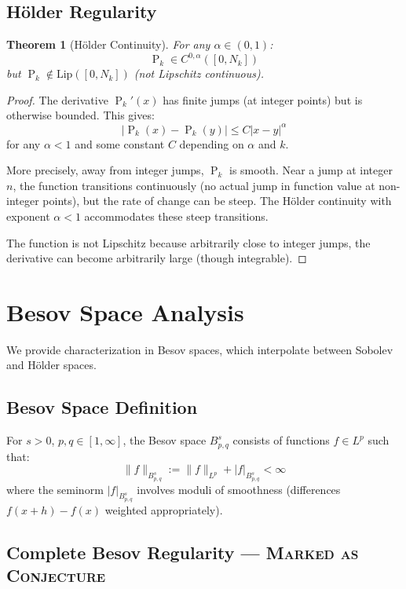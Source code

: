 ﻿\documentclass[12pt,a4paper]{report}
\theoremstyle{plain}
\newtheorem{theorem}{Theorem}[section]
\theoremstyle{definition}
\DeclareMathOperator{\Pk}{P}
\begin{document}
\section{H\"older Regularity}

\begin{theorem}[H\"older Continuity]
\label{thm:holder}
For any $\alpha \in (0,1)$:
\[
\Pk_k \in C^{0,\alpha}([0,N_k])
\]
but $\Pk_k \notin \text{Lip}([0,N_k])$ (not Lipschitz continuous).
\end{theorem}

\begin{proof}
The derivative $\Pk_k'(x)$ has finite jumps (at integer points) but is otherwise bounded. This gives:
\[
|\Pk_k(x) - \Pk_k(y)| \leq C|x-y|^{\alpha}
\]
for any $\alpha < 1$ and some constant $C$ depending on $\alpha$ and $k$.

More precisely, away from integer jumps, $\Pk_k$ is smooth. Near a jump at integer $n$, the function transitions continuously (no actual jump in function value at non-integer points), but the rate of change can be steep. The H\"older continuity with exponent $\alpha < 1$ accommodates these steep transitions.

The function is not Lipschitz because arbitrarily close to integer jumps, the derivative can become arbitrarily large (though integrable).
\end{proof}

\chapter{Besov Space Analysis}
\label{ch:besov}

We provide characterization in Besov spaces, which interpolate between Sobolev and H\"older spaces.

\section{Besov Space Definition}

For $s > 0$, $p, q \in [1,\infty]$, the Besov space $B^s_{p,q}$ consists of functions $f \in L^p$ such that:
\[
\|f\|_{B^s_{p,q}} := \|f\|_{L^p} + |f|_{B^s_{p,q}} < \infty
\]
where the seminorm $|f|_{B^s_{p,q}}$ involves moduli of smoothness (differences $f(x+h) - f(x)$ weighted appropriately).

\section{Complete Besov Regularity --- \textsc{Marked as Conjecture}}
\end{document}
